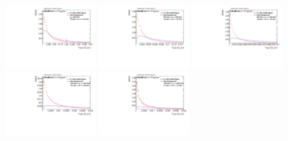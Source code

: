 \begin{figure}[H]
\includegraphics[width=0.3\textwidth]{sascha_input/Appendix/Distributions/higgs/distributions/beta3/h_normal_tj_C2_3_bin1.pdf} \hspace{1mm}
\includegraphics[width=0.3\textwidth]{sascha_input/Appendix/Distributions/higgs/distributions/beta3/h_normal_tj_C2_3_bin2.pdf} \hspace{4mm}
\includegraphics[width=0.3\textwidth]{sascha_input/Appendix/Distributions/higgs/distributions/beta3/h_normal_tj_C2_3_bin3.pdf} 
\bigskip
\includegraphics[width=0.3\textwidth]{sascha_input/Appendix/Distributions/higgs/distributions/beta3/h_normal_tj_C2_3_bin4.pdf} \hspace{4mm}
\includegraphics[width=0.3\textwidth]{sascha_input/Appendix/Distributions/higgs/distributions/beta3/h_normal_tj_C2_3_bin5.pdf} 


\end{figure}

